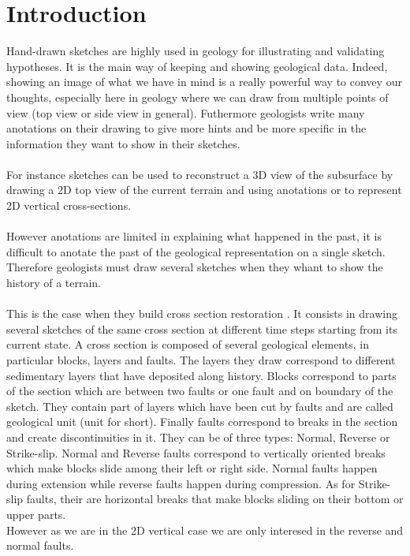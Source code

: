 \documentclass[12pt, a4paper]{report} %
\begin{document}
\chapter{Introduction}
\label{ch:intro}
Hand-drawn sketches are highly used in geology for illustrating and validating hypotheses. It is the main way of keeping and showing geological data. Indeed, showing an image of what we have in mind is a really powerful way to convey our thoughts, especially here in geology where we can draw from multiple points of view (top view or side view in general). Futhermore geologists write many anotations on their drawing to give more hints and be more specific in the information they want to show in their sketches.\\\\
For instance sketches can be used to reconstruct a 3D view of the subsurface by drawing a 2D top view of the current terrain \cite{brazil} and using anotations or to represent 2D vertical cross-sections. \\\\
However anotations are limited in explaining what happened in the past, it is difficult to anotate the past of the geological representation on a single sketch. Therefore geologists must draw several sketches when they whant to show the history of a terrain. \\\\
This is the case when they build cross section restoration \cite{SectionRestoration}. It consists in drawing several sketches of the same cross section at different time steps starting from its current state. A cross section is composed of several geological elements, in particular blocks, layers and faults. The layers they draw correspond to different sedimentary layers that have deposited  along history. Blocks correspond to parts of the section which are between two faults or one fault and on boundary of the sketch. They contain part of layers which have been cut by faults and are called geological unit (unit for short).
Finally faults correspond to breaks in the section and create discontinuities in it. They can be of three types:
Normal, Reverse or Strike-slip. Normal and Reverse faults correspond to vertically oriented breaks which make blocks slide among their left or right side. Normal faults happen during extension while reverse faults happen during compression. As for Strike-slip faults, their are horizontal breaks that make blocks sliding on their bottom or upper parts.\\
However as we are in the 2D vertical case we are only interesed in the reverse and normal faults.\\\\
\end{document}

